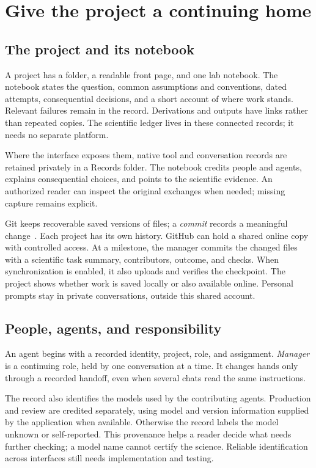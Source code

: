 \documentclass[11pt]{article}
\begin{document}
\section{Give the project a continuing home}
\subsection{The project and its notebook}
A project has a folder, a readable front page, and one lab notebook. The notebook states the question, common assumptions and conventions, dated attempts, consequential decisions, and a short account of where work stands. Relevant failures remain in the record. Derivations and outputs have links rather than repeated copies. The scientific ledger lives in these connected records; it needs no separate platform.

Where the interface exposes them, native tool and conversation records are retained privately in a Records folder. The notebook credits people and agents, explains consequential choices, and points to the scientific evidence. An authorized reader can inspect the original exchanges when needed; missing capture remains explicit.

Git keeps recoverable saved versions of files; a \emph{commit} records a meaningful change~\cite{git}. Each project has its own history. GitHub can hold a shared online copy with controlled access. At a milestone, the manager commits the changed files with a scientific task summary, contributors, outcome, and checks. When synchronization is enabled, it also uploads and verifies the checkpoint. The project shows whether work is saved locally or also available online. Personal prompts stay in private conversations, outside this shared account.

\subsection{People, agents, and responsibility}
An agent begins with a recorded identity, project, role, and assignment. \emph{Manager} is a continuing role, held by one conversation at a time. It changes hands only through a recorded handoff, even when several chats read the same instructions.

The record also identifies the models used by the contributing agents. Production and review are credited separately, using model and version information supplied by the application when available. Otherwise the record labels the model unknown or self-reported. This provenance helps a reader decide what needs further checking; a model name cannot certify the science. Reliable identification across interfaces still needs implementation and testing.
\end{document}
